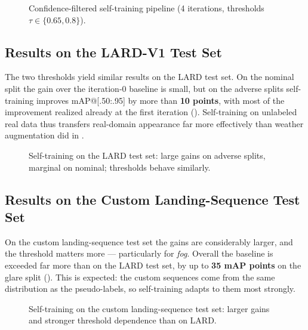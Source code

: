 \begin{figure}[th]
    \centering
    \caption{Confidence-filtered self-training pipeline (4 iterations, thresholds
    $\tau\in\{0.65,0.8\}$).}
    \label{fig:pl-loop}
\end{figure}

\subsection{Results on the LARD-V1 Test Set}
\label{subsec:pl-lard}
The two thresholds yield similar results on the LARD test set. On the nominal split
the gain over the iteration-0 baseline is small, but on the adverse splits
self-training improves mAP@[.50:.95] by more than \textbf{10 points}, with most of the
improvement realized already at the first iteration (). Self-training
on unlabeled real data thus transfers real-domain appearance far more effectively than
weather augmentation did in .

\begin{figure}[th]
    \centering
    \caption{Self-training on the LARD test set: large gains on adverse splits,
    marginal on nominal; thresholds behave similarly.}
    \label{fig:pl-lard}
\end{figure}

\subsection{Results on the Custom Landing-Sequence Test Set}
\label{subsec:pl-custom}
On the custom landing-sequence test set the gains are considerably larger, and the
threshold matters more --- particularly for \emph{fog}. Overall the baseline is
exceeded far more than on the LARD test set, by up to \textbf{35 mAP points} on the
glare split (). This is expected: the custom sequences come from
the same distribution as the pseudo-labels, so self-training adapts to them most
strongly.

\begin{figure}[th]
    \centering
    \caption{Self-training on the custom landing-sequence test set: larger gains and
    stronger threshold dependence than on LARD.}
    \label{fig:pl-custom}
\end{figure}

